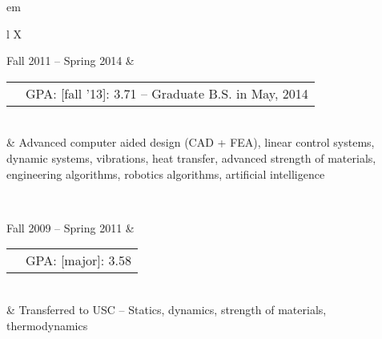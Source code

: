

	
{ em
\begin{tabu}{ L{\tabularIndent} X } \hhline{==} 
	\hhline{==}
	
	Fall 2011 -- Spring 2014 & 
	\begin{tabular}{ l | l }
		\mysubsection{University of Southern California} & GPA: [fall '13]: 3.71 -- Graduate B.S. in May, 2014 \\ \cline{1-1}
	\end{tabular}
	\\
	&
	Advanced computer aided design (CAD + FEA), linear control systems, dynamic systems, vibrations, heat transfer, advanced strength of materials, engineering algorithms, robotics algorithms, artificial intelligence

\\ \hhline{==}

	Fall 2009 -- Spring 2011 & 
	\begin{tabular}{ l | l }
		\mysubsection{University of Massachusetts, Amherst} & GPA: [major]: 3.58 \\ \cline{1-1}
	\end{tabular}
	\\
	& Transferred to USC -- Statics, dynamics, strength of materials, thermodynamics
\end{tabu}}
